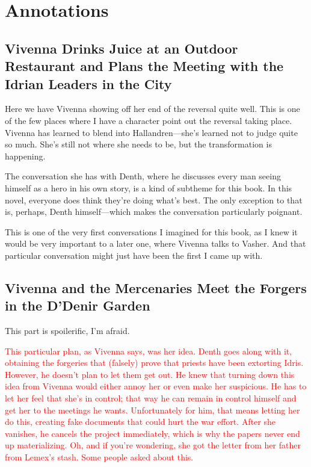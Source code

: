 \section*{Annotations}

\subsection*{Vivenna Drinks Juice at an Outdoor Restaurant and Plans the Meeting with the Idrian Leaders in the City}

Here we have Vivenna showing off her end of the reversal quite well. This is one of the few places where I have a character point out the reversal taking place. Vivenna has learned to blend into Hallandren—she’s learned not to judge quite so much. She’s still not where she needs to be, but the transformation is happening.

The conversation she has with Denth, where he discusses every man seeing himself as a hero in his own story, is a kind of subtheme for this book. In this novel, everyone does think they’re doing what’s best. The only exception to that is, perhaps, Denth himself—which makes the conversation particularly poignant.

This is one of the very first conversations I imagined for this book, as I knew it would be very important to a later one, where Vivenna talks to Vasher. And that particular conversation might just have been the first I came up with.

\subsection*{Vivenna and the Mercenaries Meet the Forgers in the D’Denir Garden}

This part is spoilerific, I’m afraid.

\textcolor{red}{
This particular plan, as Vivenna says, was her idea. Denth goes along with it, obtaining the forgeries that (falsely) prove that priests have been extorting Idris. However, he doesn’t plan to let them get out.
}
\textcolor{red}{
He knew that turning down this idea from Vivenna would either annoy her or even make her suspicious. He has to let her feel that she’s in control; that way he can remain in control himself and get her to the meetings he wants. Unfortunately for him, that means letting her do this, creating fake documents that could hurt the war effort.
}
\textcolor{red}{
After she vanishes, he cancels the project immediately, which is why the papers never end up materializing.
}
\textcolor{red}{
Oh, and if you’re wondering, she got the letter from her father from Lemex’s stash. Some people asked about this.
}

